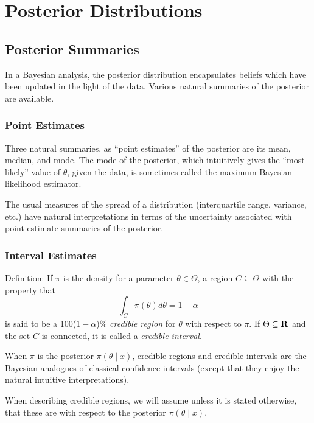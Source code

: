 \documentclass[12pt]{article}
\def\ni{\noindent}
\begin{document}
\normalsize



\section{Posterior Distributions}

\subsection{Posterior Summaries}

In a Bayesian analysis, the posterior distribution encapsulates
beliefs which have been updated in the light of the data.  Various
natural summaries of the posterior are available.

\subsubsection{Point Estimates}

Three natural summaries, as ``point estimates'' of the posterior are
its mean, median, and mode.  The mode of the posterior, which
intuitively gives the ``most likely'' value of $\theta$, given the
data, is sometimes called the maximum Bayesian likelihood estimator.

The usual measures of the spread of a distribution (interquartile
range, variance, etc.) have natural interpretations in terms of the
uncertainty associated with point estimate summaries of the posterior.

\subsubsection{Interval Estimates}

\ni\underline{Definition}:  If $\pi$ is the density for a parameter
$\theta \in \Theta$, a region $C \subseteq \Theta$ with the property
that
$$\int_C \pi(\theta)d\theta=1-\alpha$$
is said to be a 100($1-\alpha$)\% {\it credible region} for $\theta$
with respect to $\pi$.  If $\Theta \subseteq {\bf R}$ and the set $C$ is
connected, it is called a {\it credible interval}.

When $\pi$ is the posterior $\pi(\theta \mid x)$, credible regions and
credible intervals are the Bayesian analogues of classical confidence
intervals (except that they enjoy the natural intuitive
interpretations).

When describing credible regions, we will assume
unless it is stated otherwise, that these are with respect to the
posterior $\pi(\theta \mid x)$.
\end{document}
